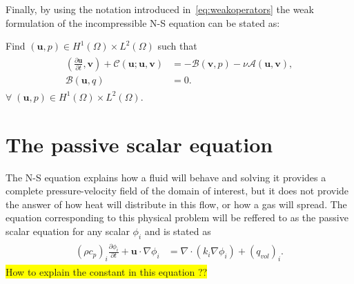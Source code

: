 Finally, by using the notation introduced in~\ref{eq:weakoperators} the weak formulation of the incompressible
N-S equation can be stated as: 

Find $(\mathbf{u}, p) \in H^1(\Omega)\times L^2(\Omega)$ such that 
\begin{align}
    \begin{split}
        (\frac{\partial \mathbf{u}}{\partial t},\mathbf{v})
        + \mathcal{C}(\mathbf{u};\mathbf{u},\mathbf{v})
        &= -\mathcal{B}(\mathbf{v},p) 
        -\nu\mathcal{A}(\mathbf{u},\mathbf{v}), \\
        \mathcal{B}(\mathbf{u},q) &= 0.
    \end{split}
	\label{eq:NSweak}
\end{align}
$\forall\; (\mathbf{u}, p) \in H^1(\Omega)\times L^2(\Omega)$.


%
\section{The passive scalar equation}
The N-S equation explains how a fluid will behave and solving it provides a complete pressure-velocity field of the 
domain of interest, but it does not provide the answer of how heat will distribute in this flow, or how a gas will spread.
The equation corresponding to this physical problem will be reffered to as the passive scalar equation for any scalar 
$\phi_i$ and is stated as 
\begin{align}
    \begin{split}
        (\rho c_p)_i\frac{\partial \phi_i}{\partial t} + \mathbf{u}\cdot \nabla\phi_i 
        &= \nabla \cdot(k_i\nabla \phi_i)+ (q_{vol})_i.
    \end{split}
	\label{eq:PS}
\end{align}
\colorbox{yellow}{How to explain the constant in this equation ??} 
